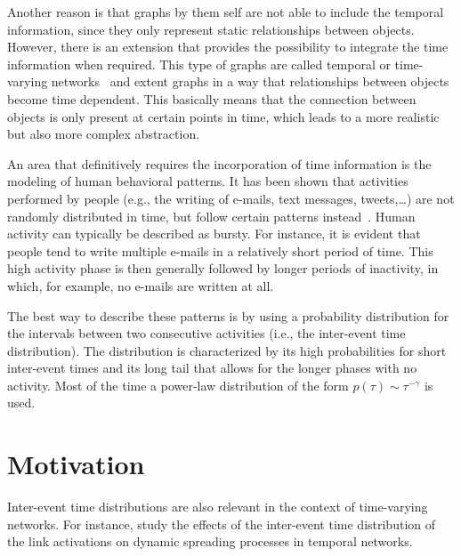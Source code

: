 Another reason is that graphs by them self are not able to include the temporal information, since they only represent static relationships between objects.
However, there is an extension that provides the possibility to integrate the time information when required.
This type of graphs are called temporal or time-varying networks~\cite{Holme2012, Holme2015} and extent graphs in a way that relationships between objects become time dependent.
This basically means that the connection between objects is only present at certain points in time, which leads to a more realistic but also more complex abstraction.

An area that definitively requires the incorporation of time information is the modeling of human behavioral patterns.
It has been shown that activities performed by people (e.g., the writing of e-mails, text messages, tweets,\ldots) are not randomly distributed in time, but follow certain patterns instead~\cite{Barabasi2005}.
Human activity can typically be described as bursty.
For instance, it is evident that people tend to write multiple e-mails in a relatively short period of time.
This high activity phase is then generally followed by longer periods of inactivity, in which, for example, no e-mails are written at all.

The best way to describe these patterns is by using a probability distribution for the intervals between two consecutive activities (i.e., the inter-event time distribution).
The distribution is characterized by its high probabilities for short inter-event times and its long tail that allows for the longer phases with no activity.
Most of the time a power-law distribution of the form \( p(\tau) \sim \tau^{-\gamma} \) is used.




\section{Motivation}
\label{sec:motivation}

Inter-event time distributions are also relevant in the context of time-varying networks.
For instance, \citet{Lambiotte2013} study the effects of the inter-event time distribution of the link activations on dynamic spreading processes in temporal networks.


